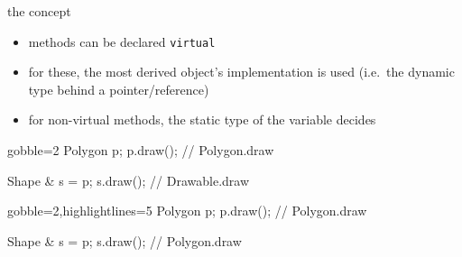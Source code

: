 \begin{frame}[fragile]
  \begin{block}{the concept}
    \begin{itemize}
    \item methods can be declared \texttt{virtual}
    \item for these, the most derived object's implementation is used
          (i.e.\ the dynamic type behind a pointer/reference)
    \item for non-virtual methods, the static type of the variable decides
    \end{itemize}
  \end{block}
  \begin{overprint}
  \begin{multicols}{2}
    \begin{cppcode*}{gobble=2}
      Polygon p;
      p.draw(); // Polygon.draw

      Shape & s = p;
      s.draw(); // Drawable.draw
    \end{cppcode*}
    \columnbreak
    \center
  \end{multicols}

    \begin{multicols}{2}
    \begin{cppcode*}{gobble=2,highlightlines=5}
      Polygon p;
      p.draw(); // Polygon.draw

      Shape & s = p;
      s.draw(); // Polygon.draw
    \end{cppcode*}
    \columnbreak
    \center
  \end{multicols}
  \end{overprint}
\end{frame}

